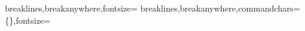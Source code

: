 %
%
\usepackage{fvextra}
%
  {breaklines,breakanywhere,fontsize=\small}
%
  {breaklines,breakanywhere,commandchars=\\\{\},fontsize=\small}
